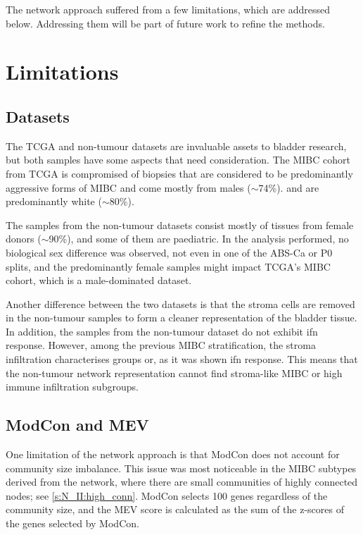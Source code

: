 The network approach suffered from a few limitations, which are addressed below. Addressing them will be part of future work to refine the methods.



\section{Limitations} \label{s:limitations}

\subsection*{Datasets}

The TCGA and non-tumour datasets are invaluable assets to bladder research, but both samples have some aspects that need consideration. The MIBC cohort from TCGA is compromised of biopsies that are considered to be predominantly aggressive forms of MIBC and come mostly from males (\(\sim\)74\%). and are predominantly white (\(\sim\)80\%).

The samples from the non-tumour datasets consist mostly of tissues from female donors (\(\sim\)90\%), and some of them are paediatric. In the analysis performed, no biological sex difference was observed, not even in one of the ABS-Ca or P0 splits, and the predominantly female samples might impact TCGA's MIBC cohort, which is a male-dominated dataset.

Another difference between the two datasets is that the stroma cells are removed in the non-tumour samples to form a cleaner representation of the bladder tissue. In addition, the samples from the non-tumour dataset do not exhibit \acrlong{ifn} response. However, among the previous MIBC stratification, the stroma infiltration characterises groups or, as it was shown \acrshort{ifn} response. This means that the non-tumour network representation cannot find stroma-like MIBC or high immune infiltration subgroups.


\subsection*{ModCon and MEV}

One limitation of the network approach is that ModCon does not account for community size imbalance. This issue was most noticeable in the MIBC subtypes derived from the network, where there are small communities of highly connected nodes; see \cref{s:N_II:high_conn}. ModCon selects 100 genes regardless of the community size, and the MEV score is calculated as the sum of the z-scores of the genes selected by ModCon.

